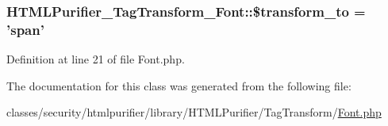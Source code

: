 \hypertarget{classHTMLPurifier__TagTransform__Font_ae7ea191975d1e5b5d1045620a8e78330}{
\subsubsection[{\$transform\+\_\+to}]{\setlength{\rightskip}{0pt plus 5cm}H\+T\+M\+L\+Purifier\+\_\+\+Tag\+Transform\+\_\+\+Font\+::\$transform\+\_\+to = 'span'}}\label{classHTMLPurifier__TagTransform__Font_ae7ea191975d1e5b5d1045620a8e78330}


Definition at line 21 of file Font.\+php.



The documentation for this class was generated from the following file\+:\begin{DoxyCompactItemize}
\item 
classes/security/htmlpurifier/library/\+H\+T\+M\+L\+Purifier/\+Tag\+Transform/\hyperlink{TagTransform_2Font_8php}{Font.\+php}\end{DoxyCompactItemize}

